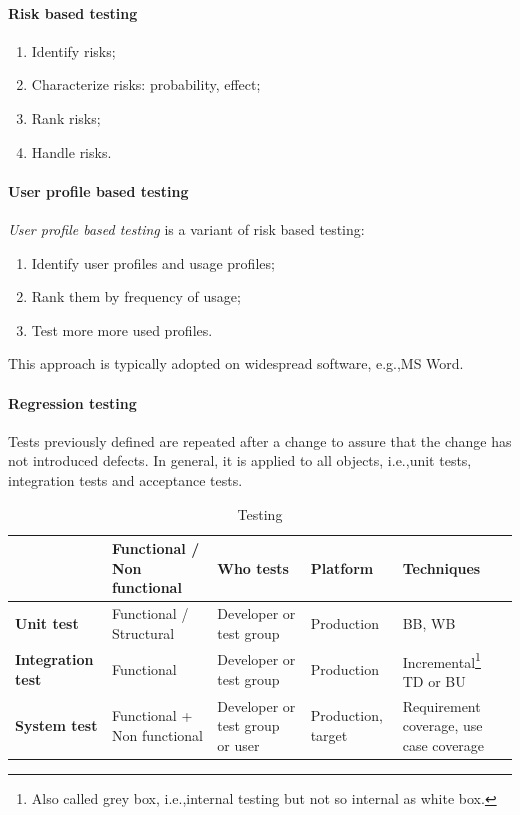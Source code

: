 \paragraph{Risk based testing}
\begin{enumerate}
\item Identify risks;
\item Characterize risks: probability, effect;
\item Rank risks;
\item Handle risks.
\end{enumerate}

\paragraph{User profile based testing}
\emph{User profile based testing} is a variant of risk based testing:
\begin{enumerate}
\item Identify user profiles and usage profiles;
\item Rank them by frequency of usage;
\item Test more more used profiles.
\end{enumerate}
This approach is typically adopted on widespread software, e.g.,\@ MS Word.

\paragraph{Regression testing}
Tests previously defined are repeated after a change to assure that the change has not introduced defects. In general, it is applied to all objects, i.e.,\@ unit tests, integration tests and acceptance tests.

\begin{table}
\centering
\small
\begin{tabularx}{\textwidth}{|X|X|X|X|X|}
\hline 
 & Functional / Non functional & Who tests & Platform & Techniques \\ 
\hline
\textbf{Unit test} & Functional / Structural & Developer or test group & Production  & BB, WB\\ 
\hline 
\textbf{Integration test} & Functional & Developer or test group & Production & Incremental\footnote{Also called grey box, i.e.,\@ internal testing but not so internal as white box.} TD or BU\\ 
\hline 
\textbf{System test} & Functional + Non functional & Developer or test group or user & Production, target & Requirement coverage, use case coverage \\ 
\hline 
\end{tabularx}
\caption{Testing}
\end{table}

